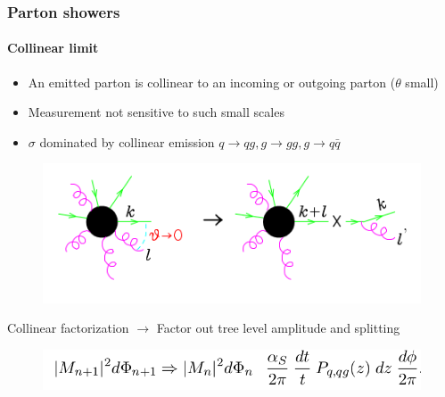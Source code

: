 \documentclass[aspectratio=43]{beamer}
\begin{document}
\begin{frame}

	\frametitle{Parton showers}
	\framesubtitle{Collinear limit}
	
	\begin{itemize} 
		\item An emitted parton is collinear to an incoming or outgoing parton ($\theta$ small)
		\item Measurement not sensitive to such small scales
		\item $\sigma$ dominated by collinear emission $q \rightarrow qg, g \rightarrow gg, g \rightarrow q\bar{q}$
	\end{itemize}
	
	\begin{figure}
		\includegraphics[width = 7 cm]{plots/collinear_factorization.png}
	\end{figure}
	
	Collinear factorization $\longrightarrow$ Factor out tree level amplitude and splitting
	\begin{figure}
		\includegraphics[width = 8 cm]{plots/eq_factorization_theorem.png}
	\end{figure}

\end{frame}
\end{document}
